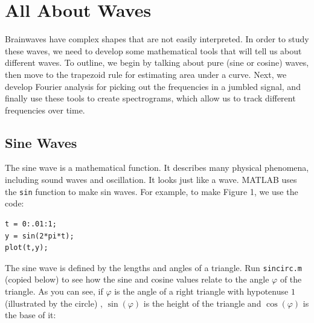 \documentclass{article}
\begin{document}
\section{All About Waves}
Brainwaves have complex shapes that are not easily interpreted.  In order to study these waves, we need to develop some mathematical tools that will tell us about different waves.  To outline, we begin by talking about pure (sine or cosine) waves, then move to the trapezoid rule for estimating area under a curve.  Next, we develop Fourier analysis for picking out the frequencies in a jumbled signal, and finally use these tools to create spectrograms, which allow us to track different frequencies over time.


\subsection{Sine Waves}
The sine wave is a mathematical function.  It describes many physical phenomena, including sound waves and oscillation.  It looks just like a wave.  MATLAB uses the {\tt sin} function to make sin waves.  For example, to make Figure 1, we use the code: 

\begin{verbatim}
t = 0:.01:1;
y = sin(2*pi*t);
plot(t,y);
\end{verbatim}

The sine wave is defined by the lengths and angles of a triangle.  Run {\tt sincirc.m} (copied below) to see how the sine and cosine values relate to the angle $\varphi$ of the triangle.  As you can see, if $\varphi$ is the angle of a right triangle with hypotenuse $1$ (illustrated by the circle) , $\sin(\varphi)$ is the height of the triangle and $\cos(\varphi)$ is the base of it:




\end{document}
